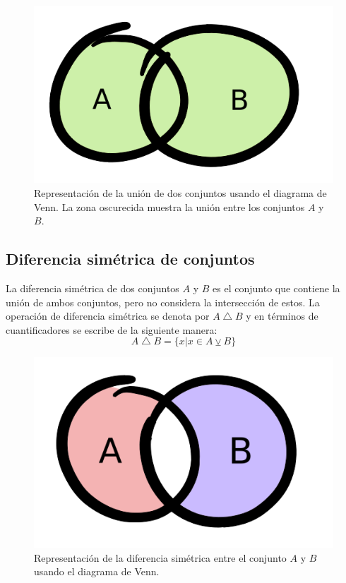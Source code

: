 \begin{center}
	\begin{figure}[ht!]
	\centering
    		\includegraphics[scale=0.5]{FiguresBM/union.png}
    		\caption[Representación de la unión de dos conjuntos]{Representación de la unión de dos conjuntos usando el diagrama de Venn. La zona oscurecida muestra la unión entre los conjuntos $A$ y $B$.}
	\end{figure}
\end{center}

\subsection{Diferencia simétrica de conjuntos}
La diferencia simétrica de dos conjuntos $A$ y $B$ es el conjunto que contiene la unión de ambos conjuntos, pero no considera la intersección de estos. La operación de diferencia simétrica se denota por $A\bigtriangleup B$ y en términos de cuantificadores se escribe de la siguiente manera:
\begin{equation*}
A\bigtriangleup B=\{x|x\in A\veebar B\}
\end{equation*}

\begin{center}
	\begin{figure}[ht!]
	\centering
    		\includegraphics[scale=0.5]{FiguresBM/diferencias.png}
    		\caption[Representación de la diferencia simétrica entre los conjuntos $A$ y $B$ ]{Representación de la diferencia simétrica entre el conjunto $A$ y $B$ usando el diagrama de Venn.}
	\end{figure}
\end{center}


